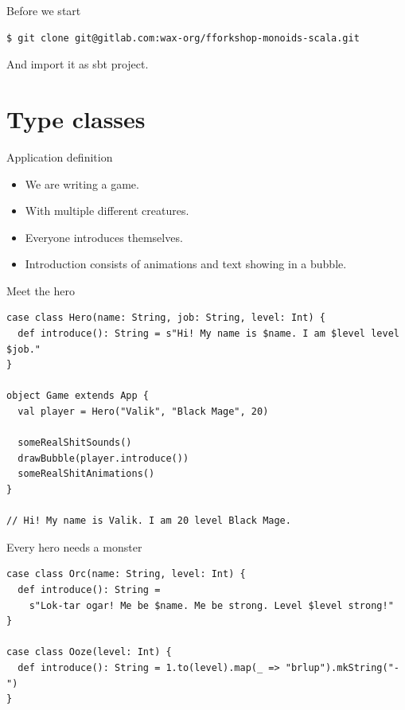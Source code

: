 \documentclass[presentation,aspectratio=169,smaller]{beamer}
\begin{document}
\begin{frame}[label={sec:org337975e},fragile]{Before we start}
 \begin{verbatim}
$ git clone git@gitlab.com:wax-org/fforkshop-monoids-scala.git
\end{verbatim}

And import it as sbt project.
\end{frame}

\section{Type classes}
\label{sec:orgb7deeb5}

\begin{frame}[label={sec:org7809d02}]{Application definition}
\begin{itemize}
\item We are writing a game.
\item With multiple different creatures.
\item Everyone introduces themselves.
\item Introduction consists of animations and text showing in a bubble.
\end{itemize}
\end{frame}

\begin{frame}[label={sec:orgd21c687},fragile]{Meet the hero}
 \begin{verbatim}
case class Hero(name: String, job: String, level: Int) {
  def introduce(): String = s"Hi! My name is $name. I am $level level $job."
}

object Game extends App {
  val player = Hero("Valik", "Black Mage", 20)

  someRealShitSounds()
  drawBubble(player.introduce())
  someRealShitAnimations()
}

// Hi! My name is Valik. I am 20 level Black Mage.
\end{verbatim}
\end{frame}

\begin{frame}[label={sec:orgec1d668},fragile]{Every hero needs a monster}
 \begin{verbatim}
case class Orc(name: String, level: Int) {
  def introduce(): String =
    s"Lok-tar ogar! Me be $name. Me be strong. Level $level strong!"
}

case class Ooze(level: Int) {
  def introduce(): String = 1.to(level).map(_ => "brlup").mkString("-")
}
\end{verbatim}
\end{frame}
\end{document}
